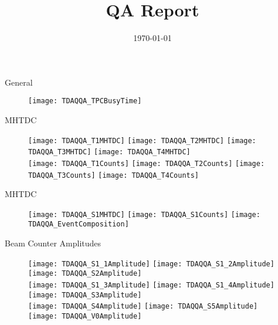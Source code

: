 \documentclass[11pt]{beamer}
\title[QA]{QA Report}
\date{\today}
\begin{document}
\begin{frame}
  \titlepage
\end{frame}

\begin{frame}{General}
\begin{figure}
\centering
\texttt{[image: TDAQQA\_TPCBusyTime]}
\end{figure}
\end{frame}


\begin{frame}{MHTDC}
\begin{figure}
\centering
\texttt{[image: TDAQQA\_T1MHTDC]} 
\texttt{[image: TDAQQA\_T2MHTDC]} 
\texttt{[image: TDAQQA\_T3MHTDC]} 
\texttt{[image: TDAQQA\_T4MHTDC]} \\
\texttt{[image: TDAQQA\_T1Counts]} 
\texttt{[image: TDAQQA\_T2Counts]} 
\texttt{[image: TDAQQA\_T3Counts]} 
\texttt{[image: TDAQQA\_T4Counts]} 
\end{figure}
\end{frame}

\begin{frame}{MHTDC}
\begin{figure}
\centering
\texttt{[image: TDAQQA\_S1MHTDC]} 
\texttt{[image: TDAQQA\_S1Counts]} 
\texttt{[image: TDAQQA\_EventComposition]} 
\end{figure}
\end{frame}

\begin{frame}{Beam Counter Amplitudes}
\begin{figure}
\centering
\texttt{[image: TDAQQA\_S1\_1Amplitude]} 
\texttt{[image: TDAQQA\_S1\_2Amplitude]}
\texttt{[image: TDAQQA\_S2Amplitude]} \\
\texttt{[image: TDAQQA\_S1\_3Amplitude]}
\texttt{[image: TDAQQA\_S1\_4Amplitude]}
\texttt{[image: TDAQQA\_S3Amplitude]} \\
\texttt{[image: TDAQQA\_S4Amplitude]}
\texttt{[image: TDAQQA\_S5Amplitude]} 
\texttt{[image: TDAQQA\_V0Amplitude]} \\
\end{figure}
\end{frame}
\end{document}
